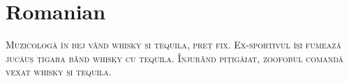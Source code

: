 

\presection\section*{\checkno Romanian}\postsection

\noindent\textsc{
Muzicologă în bej vând whisky și tequila, preț fix.
Ex-sportivul își fumează jucăuș țigara bând whisky cu tequila.
Înjurând pițigăiat, zoofobul comandă vexat whisky și tequila.
}